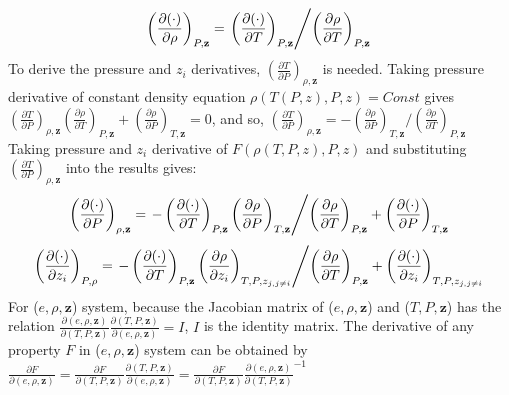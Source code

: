 \begin{align}
\left(\frac{\partial (\cdot)}{\partial \rho}\right)_{P,\mathbf{z}} =\left. \left(\frac{\partial (\cdot)}{\partial T}\right)_{P,\mathbf{z}} \middle/ \left(\frac{\partial \rho}{\partial T}\right)_{P,\mathbf{z}}\right.
\end{align}
To derive the pressure and $z_i$ derivatives, $\left(\frac{\partial T}{\partial P}\right)_{\rho,\mathbf{z}}$ is needed. Taking pressure derivative of constant density equation $\rho(T(P,z),P,z)=Const$ gives $\left(\frac{\partial T} {\partial P}\right)_{\rho,\mathbf{z}}\left(\frac{\partial \rho}{\partial T}\right)_{P,\mathbf{z}}+ \left(\frac{\partial \rho}{\partial P}\right)_{T,\mathbf{z}}=0$, and so, $\left(\frac{\partial T}{\partial P}\right)_{\rho,\mathbf{z}} = - \left(\frac{\partial \rho}{\partial P}\right)_{T,\mathbf{z}}/ \left(\frac{\partial \rho}{\partial T}\right)_{P,\mathbf{z}}$
Taking pressure and $z_i$ derivative of $F(\rho(T,P,z),P,z)$ and substituting $\left(\frac{\partial T}{\partial P}\right)_{\rho,\mathbf{z}}$ into the results gives:
\begin{align}
\left(\frac{\partial (\cdot)}{\partial P}\right)_{\rho,\mathbf{z}} = \left.-\left(\frac{\partial (\cdot)}{\partial T}\right)_{P,\mathbf{z}} \left(\frac{\partial \rho}{\partial P}\right)_{T,\mathbf{z}}\middle/ \left(\frac{\partial \rho}{\partial T}\right)_{P,\mathbf{z}}+
\left(\frac{\partial (\cdot)}{\partial P}\right)_{T,\mathbf{z}}\right.
\end{align}
\begin{align}
\left(\frac{\partial (\cdot)}{\partial z_i}\right)_{P,\rho} = \left.-\left(\frac{\partial (\cdot)}{\partial T}\right)_{P,\mathbf{z}} \left(\frac{\partial \rho}{\partial z_i}\right)_{T,P,z_{j, j \neq i}}\middle/ \left(\frac{\partial \rho}{\partial T}\right)_{P,\mathbf{z}}+
\left(\frac{\partial (\cdot)}{\partial z_i}\right)_{T,P,z_{j, j \neq i}}\right.
\end{align}
For ($e,\rho,\mathbf{z}$) system, because the Jacobian matrix of ($e,\rho,\mathbf{z}$) and ($T,P,\mathbf{z}$) has the relation $\frac{\partial (e,\rho,\mathbf{z})}{\partial(T,P,\mathbf{z})}\frac{\partial(T,P,\mathbf{z})}{\partial (e,\rho,\mathbf{z})} = I$, $I$ is the identity matrix. The derivative of any property $F$ in  ($e,\rho,\mathbf{z}$) system can be obtained by $\frac{\partial F}{\partial (e,\rho,\mathbf{z})}=\frac{\partial F}{\partial(T,P,\mathbf{z})}\frac{\partial(T,P,\mathbf{z})}{\partial (e,\rho,\mathbf{z})} = \frac{\partial F}{\partial(T,P,\mathbf{z})} \frac{\partial (e,\rho,\mathbf{z})}{\partial(T,P,\mathbf{z})}^{-1}$

